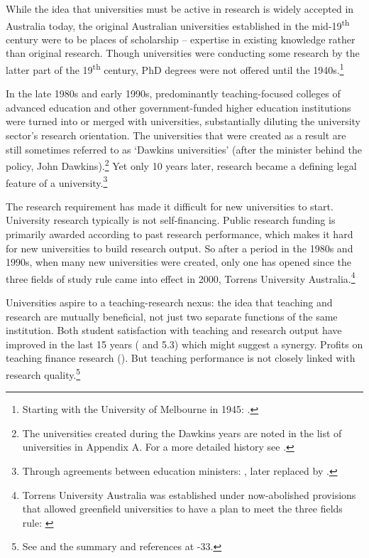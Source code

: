 \documentclass{grattan}
\begin{document}
While the idea that universities must be active in research is widely accepted in Australia today, the original Australian universities established in the mid-19\textsuperscript{th} century were to be places of scholarship -- expertise in existing knowledge rather than original research. Though universities were conducting some research by the latter part of the 19\textsuperscript{th} century, PhD degrees were not offered until the 1940s.\footnote{Starting with the University of Melbourne in 1945: \textcite[][27]{Forsyth2014ahistoryofthemo}.}

In the late 1980s and early 1990s, predominantly teaching-focused colleges of advanced education and other government-funded higher education institutions were turned into or merged with universities, substantially diluting the university sector's research orientation. The universities that were created as a result are still sometimes referred to as `Dawkins universities' (after the minister behind the policy, John Dawkins).\footnote{The universities created during the Dawkins years are noted in the list of universities in Appendix A. For a more detailed history see \textcite[][]{Macintyre2017noendofalesson}.} Yet only 10 years later, research became a defining legal feature of a university.\footnote{Through agreements between education ministers: \textcite[][]{MCEETYA2000nationalprotocols}, later replaced by \textcite[][]{MCEETYA2007nationalprotocols}.}

The research requirement has made it difficult for new universities to start. University research typically is not self-financing. Public research funding is primarily awarded according to past research performance, which makes it hard for new universities to build research output. So after a period in the 1980s and 1990s, when many new universities were created, only one has opened since the three fields of study rule came into effect in 2000, Torrens University Australia.\footnote{Torrens University Australia was established under now-abolished provisions that allowed greenfield universities to have a plan to meet the three fields rule: \textcite[][section~8.1.1.]{MCEETYA2007nationalprotocols}}

Universities aspire to a teaching-research nexus: the idea that teaching and research are mutually beneficial, not just two separate functions of the same institution. Both student satisfaction with teaching and research output have improved in the last 15 years ( and 5.3) which might suggest a synergy. Profits on teaching finance research (). But teaching performance is not closely linked with research quality.\footnote{See \textcite[][]{Cherastidtham2013theteachingresear} and the summary and references at \textcite[][31]{Norton2015thecashnexushow}-33.}
\end{document}
